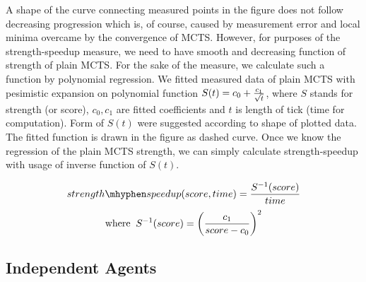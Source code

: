 A shape of the curve connecting measured points in the figure does not follow decreasing
progression which is, of course, caused by measurement error and local minima overcame by the
convergence of MCTS. However, for purposes of the strength-speedup measure, we need to have
smooth and decreasing function of strength of plain MCTS. For the sake of the measure, we
calculate such a function by polynomial regression. We fitted measured data of plain MCTS with
pesimistic expansion on polynomial function $S(t) = c_0 + { c_1 \over \sqrt{t} }$, where $S$ stands
for strength (or score), $c_0,c_1$ are fitted
coefficients and $t$ is length of tick (time for computation). Form of $S(t)$ were suggested
according to shape of plotted data. The fitted function is drawn in
the figure as dashed curve. Once we know the regression of the plain MCTS strength, we can
simply calculate strength-speedup with usage of inverse function of $S(t)$.

\begin{equation}
        strength\mhyphen speedup(score, time) = {{ S^{-1}(score) } \over time }\\
        \end{equation}
        \begin{equation}
        \mathrm{where}\;\;S^{-1}(score) = {\left({c_1 \over {score - c_0}}\right)}^2
\end{equation}



\subsection{Independent Agents}


